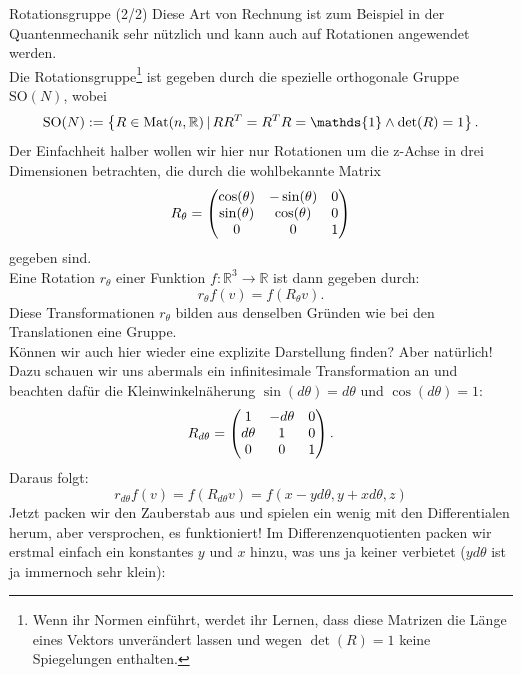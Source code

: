 \begin{Beispiel}{Rotationsgruppe (2/2)}
Diese Art von Rechnung ist zum Beispiel in der Quantenmechanik sehr nützlich und kann auch auf Rotationen angewendet werden.\\
Die Rotationsgruppe\footnote{Wenn ihr Normen einführt, werdet ihr Lernen, dass diese Matrizen die Länge eines Vektors unverändert lassen und wegen $\det(R)=1$ keine Spiegelungen enthalten.} ist gegeben durch die spezielle orthogonale Gruppe $\text{SO}(N)$, wobei 
\begin{equation*}
    \text{SO}(N) := \Menge{R \in \Met(n,\mathbb{R})}{RR^{T}=R^{T}R=\mathds{1} \land \det(R) = 1}.
\end{equation*}
Der Einfachheit halber wollen wir hier nur Rotationen um die z-Achse in drei Dimensionen betrachten, die durch die wohlbekannte Matrix
\begin{equation*}
    R_{\theta} = \begin{pmatrix}\cos(\theta) & -\sin(\theta) & 0 \\ \sin(\theta) & \cos(\theta) & 0 \\ 0 & 0 & 1\end{pmatrix}
\end{equation*}
gegeben sind.\\
Eine Rotation $r_{\theta}$ einer Funktion $f:\mathbb{R}^{3} \rightarrow \mathbb{R}$ ist dann gegeben durch:
\begin{equation*}
    r_{\theta}f(v) = f(R_{\theta} v).
\end{equation*}
Diese Transformationen $r_{\theta}$ bilden aus denselben Gründen wie bei den Translationen eine Gruppe. \\
Können wir auch hier wieder eine explizite Darstellung finden? Aber natürlich! Dazu schauen wir uns abermals ein infinitesimale Transformation an und beachten dafür die Kleinwinkelnäherung $\sin(d\theta)=d\theta$ und $\cos(d\theta)=1$:
\begin{equation*}
    R_{d\theta}=\begin{pmatrix}1 & -d\theta & 0 \\ d\theta & 1 & 0 \\ 0 & 0 & 1\end{pmatrix}.
\end{equation*}
Daraus folgt:
\begin{equation*}
    r_{d\theta}f(v) = f(R_{d\theta}v) = f(x-yd\theta, y+xd\theta, z)
\end{equation*}
Jetzt packen wir den Zauberstab aus und spielen ein wenig mit den Differentialen herum, aber versprochen, es funktioniert! Im Differenzenquotienten packen wir erstmal einfach ein konstantes $y$ und $x$ hinzu, was uns ja keiner verbietet ($yd\theta$ ist ja immernoch sehr klein):

\end{Beispiel}
